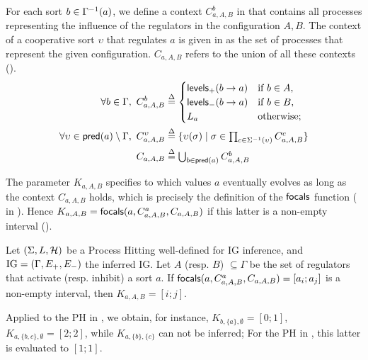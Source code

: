 For each sort $b \in \Gamma^{-1}(a)$, we define a context $C^b_{a,A,B}$ in  that contains all processes representing the influence of the regulators in the configuration $A,B$.
The context of a cooperative sort $\upsilon$ that regulates $a$ is given in  as the set of processes that represent the given configuration.
$C_{a,A,B}$ refers to the union of all these contexts ().
\begin{align}
\label{eq:param_context}
\forall b\in\Gamma,~
C_{a,A,B}^b & \stackrel{\Delta}= \begin{cases}
\mathsf{levels}_+(b\rightarrow a) & \text{if $b \in A$,}\\
\mathsf{levels}_-(b\rightarrow a) & \text{if $b \in B$,}\\
L_a		& \text{otherwise;}\\
\end{cases}
\\
\label{eq:param_context_coop}
\forall \upsilon \in \mathsf{pred}(a)\setminus\Gamma,~
C_{a,A,B}^\upsilon & \stackrel{\Delta}= \{
\upsilon(\sigma) \mid \sigma \in \textstyle\prod_{c\in\Sigma^{-1}(\upsilon)}C_{a,A,B}^c \}
\\
C_{a,A,B} & \stackrel{\Delta}= \textstyle\bigcup_{b\in\mathsf{pred}(a)} C^b_{a,A,B}
\label{eq:K-ctx}
\end{align}

The parameter $K_{a,A,B}$ specifies to which values $a$ eventually evolves as long as the context
$C_{a,A,B}$ holds, which is precisely the definition of the $\mathsf{focals}$ function
( in ).
Hence $K_{a,A,B} = \mathsf{focals}(a,C^a_{a,A,B},C_{a,A,B})$ if this latter is a non-empty interval
().

\begin{proposition}
\label{pps:param_K}
Let $(\Sigma, L, \mathcal{H})$ be a Process Hitting well-defined for IG inference, and $\mathrm{IG} = (\Gamma,
E_+, E_-)$ the inferred IG.
Let $A$ (resp. $B$) $\subseteq \Gamma$ be the set of regulators that activate (resp. inhibit) a sort
$a$.
If $\mathsf{focals}(a,C^a_{a,A,B},C_{a,A,B})=[a_i;a_j]$ is a non-empty interval, 
	then $K_{a,A,B} = [i;j]$.
\end{proposition}

\begin{example*}
Applied to the PH in , we obtain, for instance, 
$K_{b,\{a\},\emptyset} = [0 ; 1]$,
$K_{a,\{b,c\},\emptyset} = [2 ; 2]$,
while $K_{a,\{b\},\{c\}}$ can not be inferred;
For the PH in , this latter is evaluated to $[1;1]$.
\end{example*}


